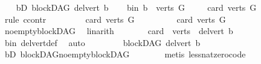 \begin{isabellebody}
\ \ \isamarkupfalse%
\ bD{\isacharcolon}{\kern0pt}\ {\isachardoublequoteopen}blockDAG\ {\isacharparenleft}{\kern0pt}del{\isacharunderscore}{\kern0pt}vert\ b{\isacharparenright}{\kern0pt}{\isachardoublequoteclose}\isanewline
\ \ \isamarkupfalse%
\ b{\isacharunderscore}{\kern0pt}in{\isacharcolon}{\kern0pt}\ {\isachardoublequoteopen}b\ {\isasymin}\ verts\ G{\isachardoublequoteclose}\isanewline
\ \ \isamarkupfalse%
\ \ {\isachardoublequoteopen}card\ {\isacharparenleft}{\kern0pt}verts\ G{\isacharparenright}{\kern0pt}\ {\isachargreater}{\kern0pt}\ {}{\isachardoublequoteclose}\isanewline
\ \ \isamarkupfalse%
\ {\isacharparenleft}{\kern0pt}rule\ ccontr{\isacharparenright}{\kern0pt}\isanewline
\ \ \ \ \isamarkupfalse%
\ {\isachardoublequoteopen}{\isasymnot}\ {}\ {\isacharless}{\kern0pt}\ card\ {\isacharparenleft}{\kern0pt}verts\ G{\isacharparenright}{\kern0pt}{\isachardoublequoteclose}\isanewline
\ \ \ \ \isamarkupfalse%
\ \isamarkupfalse%
\ {\isachardoublequoteopen}{}\ {\isacharequal}{\kern0pt}\ card\ {\isacharparenleft}{\kern0pt}verts\ G{\isacharparenright}{\kern0pt}{\isachardoublequoteclose}\ \isamarkupfalse%
\ no{\isacharunderscore}{\kern0pt}empty{\isacharunderscore}{\kern0pt}blockDAG\ \isamarkupfalse%
\ linarith\isanewline
\ \ \ \ \isamarkupfalse%
\ \isamarkupfalse%
\ {\isachardoublequoteopen}card\ {\isacharparenleft}{\kern0pt}\ verts\ {\isacharparenleft}{\kern0pt}\ del{\isacharunderscore}{\kern0pt}vert\ b{\isacharparenright}{\kern0pt}{\isacharparenright}{\kern0pt}\ {\isacharequal}{\kern0pt}\ {}{\isachardoublequoteclose}\ \isamarkupfalse%
\ b{\isacharunderscore}{\kern0pt}in\ del{\isacharunderscore}{\kern0pt}vert{\isacharunderscore}{\kern0pt}def\ \isamarkupfalse%
\ auto\isanewline
\ \ \ \ \isamarkupfalse%
\ \isamarkupfalse%
\ {\isachardoublequoteopen}{\isasymnot}\ blockDAG\ {\isacharparenleft}{\kern0pt}del{\isacharunderscore}{\kern0pt}vert\ b{\isacharparenright}{\kern0pt}{\isachardoublequoteclose}\ \isamarkupfalse%
\ bD\ blockDAG{\isachardot}{\kern0pt}no{\isacharunderscore}{\kern0pt}empty{\isacharunderscore}{\kern0pt}blockDAG\isanewline
\ \ \ \ \ \ \isamarkupfalse%
\ {\isacharparenleft}{\kern0pt}metis\ less{\isacharunderscore}{\kern0pt}nat{\isacharunderscore}{\kern0pt}zero{\isacharunderscore}{\kern0pt}code{\isacharparenright}{\kern0pt}\ \isanewline

\end{isabellebody}
